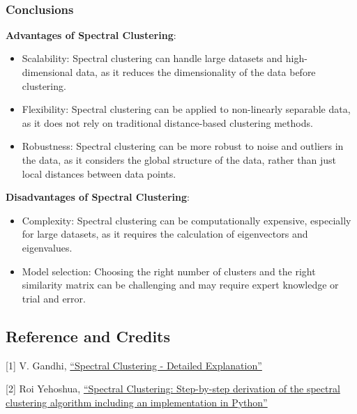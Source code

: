 \documentclass[11pt]{article}
\begin{document}
    \begin{center}
    \end{center}
    { \hspace*{\fill} \\}
    
    \subsubsection{Conclusions}\label{conclusions}

\textbf{Advantages of Spectral Clustering}:

\begin{itemize}
\item
  Scalability: Spectral clustering can handle large datasets and
  high-dimensional data, as it reduces the dimensionality of the data
  before clustering.
\item
  Flexibility: Spectral clustering can be applied to non-linearly
  separable data, as it does not rely on traditional distance-based
  clustering methods.
\item
  Robustness: Spectral clustering can be more robust to noise and
  outliers in the data, as it considers the global structure of the
  data, rather than just local distances between data points.
\end{itemize}

\textbf{Disadvantages of Spectral Clustering}:

\begin{itemize}
\item
  Complexity: Spectral clustering can be computationally expensive,
  especially for large datasets, as it requires the calculation of
  eigenvectors and eigenvalues.
\item
  Model selection: Choosing the right number of clusters and the right
  similarity matrix can be challenging and may require expert knowledge
  or trial and error.
\end{itemize}
\newpage
    \subsection{Reference and Credits}\label{reference-and-credits}

{[}1{]} V. Gandhi,
\href{https://www.kaggle.com/code/vipulgandhi/spectral-clustering-detailed-explanation}{``Spectral
Clustering - Detailed Explanation''}

{[}2{]} Roi Yehoshua,
\href{https://medium.com/@roiyeho/spectral-clustering-50aee862d300}{``Spectral
Clustering: Step-by-step derivation of the spectral clustering algorithm
including an implementation in Python''}
\end{document}
